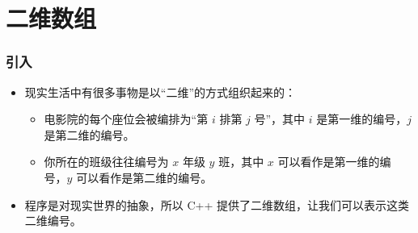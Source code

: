 \section{二维数组}

\begin{frame}[fragile]
    \frametitle{引入}

    \begin{itemize}[<+->]
        \item 现实生活中有很多事物是以“二维”的方式组织起来的：

            \begin{itemize}
                \item 电影院的每个座位会被编排为“第 $i$ 排第 $j$ 号”，其中 $i$ 是第一维的编号，$j$ 是第二维的编号。
                \item 你所在的班级往往编号为 $x$ 年级 $y$ 班，其中 $x$ 可以看作是第一维的编号，$y$ 可以看作是第二维的编号。
            \end{itemize}

        \item 程序是对现实世界的抽象，所以 C++ 提供了二维数组，让我们可以表示这类二维编号。
    \end{itemize}
\end{frame}

